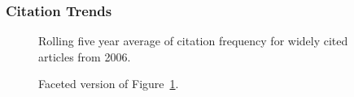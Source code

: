 \documentclass[
  10pt,
  letterpaper,
  DIV=11,
  numbers=noendperiod,
  twoside]{scrartcl}
\begin{document}
\subsubsection*{Citation Trends}\label{sec-trends-2006}

\begin{figure}


\caption{\label{fig-citation-spaghetti-2006}Rolling five year average of
citation frequency for widely cited articles from 2006.}

\end{figure}%

\begin{figure}


\caption{\label{fig-citation-facet-2006}Faceted version of
Figure~\ref{fig-citation-spaghetti-2006}.}

\end{figure}%
\end{document}
